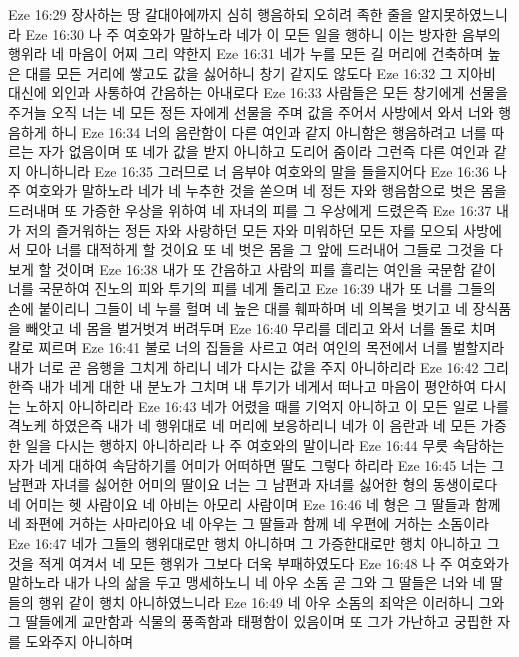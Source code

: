 Eze 16:29  장사하는 땅 갈대아에까지 심히 행음하되 오히려 족한 줄을 알지못하였느니라
Eze 16:30  나 주 여호와가 말하노라 네가 이 모든 일을 행하니 이는 방자한 음부의 행위라 네 마음이 어찌 그리 약한지
Eze 16:31  네가 누를 모든 길 머리에 건축하며 높은 대를 모든 거리에 쌓고도 값을 싫어하니 창기 같지도 않도다
Eze 16:32  그 지아비 대신에 외인과 사통하여 간음하는 아내로다
Eze 16:33  사람들은 모든 창기에게 선물을 주거늘 오직 너는 네 모든 정든 자에게 선물을 주며 값을 주어서 사방에서 와서 너와 행음하게 하니
Eze 16:34  너의 음란함이 다른 여인과 같지 아니함은 행음하려고 너를 따르는 자가 없음이며 또 네가 값을 받지 아니하고 도리어 줌이라 그런즉 다른 여인과 같지 아니하니라
Eze 16:35  그러므로 너 음부야 여호와의 말을 들을지어다
Eze 16:36  나 주 여호와가 말하노라 네가 네 누추한 것을 쏟으며 네 정든 자와 행음함으로 벗은 몸을 드러내며 또 가증한 우상을 위하여 네 자녀의 피를 그 우상에게 드렸은즉
Eze 16:37  내가 저의 즐거워하는 정든 자와 사랑하던 모든 자와 미워하던 모든 자를 모으되 사방에서 모아 너를 대적하게 할 것이요 또 네 벗은 몸을 그 앞에 드러내어 그들로 그것을 다 보게 할 것이며
Eze 16:38  내가 또 간음하고 사람의 피를 흘리는 여인을 국문함 같이 너를 국문하여 진노의 피와 투기의 피를 네게 돌리고
Eze 16:39  내가 또 너를 그들의 손에 붙이리니 그들이 네 누를 헐며 네 높은 대를 훼파하며 네 의복을 벗기고 네 장식품을 빼앗고 네 몸을 벌거벗겨 버려두며
Eze 16:40  무리를 데리고 와서 너를 돌로 치며 칼로 찌르며
Eze 16:41  불로 너의 집들을 사르고 여러 여인의 목전에서 너를 벌할지라 내가 너로 곧 음행을 그치게 하리니 네가 다시는 값을 주지 아니하리라
Eze 16:42  그리한즉 내가 네게 대한 내 분노가 그치며 내 투기가 네게서 떠나고 마음이 평안하여 다시는 노하지 아니하리라
Eze 16:43  네가 어렸을 때를 기억지 아니하고 이 모든 일로 나를 격노케 하였은즉 내가 네 행위대로 네 머리에 보응하리니 네가 이 음란과 네 모든 가증한 일을 다시는 행하지 아니하리라 나 주 여호와의 말이니라
Eze 16:44  무릇 속담하는 자가 네게 대하여 속담하기를 어미가 어떠하면 딸도 그렇다 하리라
Eze 16:45  너는 그 남편과 자녀를 싫어한 어미의 딸이요 너는 그 남편과 자녀를 싫어한 형의 동생이로다 네 어미는 헷 사람이요 네 아비는 아모리 사람이며
Eze 16:46  네 형은 그 딸들과 함께 네 좌편에 거하는 사마리아요 네 아우는 그 딸들과 함께 네 우편에 거하는 소돔이라
Eze 16:47  네가 그들의 행위대로만 행치 아니하며 그 가증한대로만 행치 아니하고 그것을 적게 여겨서 네 모든 행위가 그보다 더욱 부패하였도다
Eze 16:48  나 주 여호와가 말하노라 내가 나의 삶을 두고 맹세하노니 네 아우 소돔 곧 그와 그 딸들은 너와 네 딸들의 행위 같이 행치 아니하였느니라
Eze 16:49  네 아우 소돔의 죄악은 이러하니 그와 그 딸들에게 교만함과 식물의 풍족함과 태평함이 있음이며 또 그가 가난하고 궁핍한 자를 도와주지 아니하며
